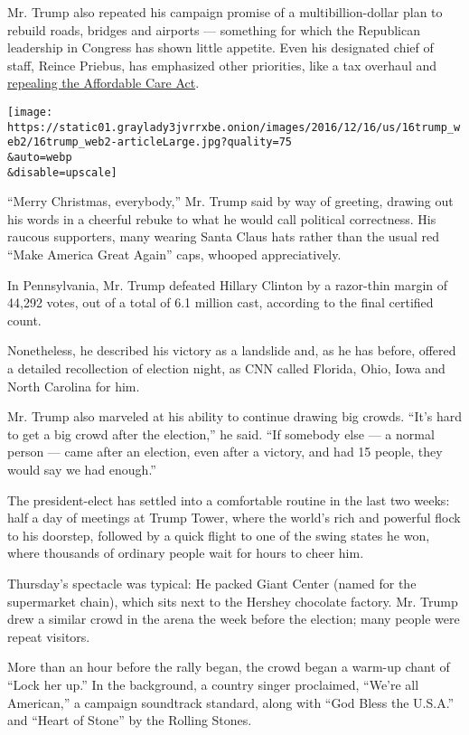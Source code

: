 Mr. Trump also repeated his campaign promise of a multibillion-dollar
plan to rebuild roads, bridges and airports --- something for which the
Republican leadership in Congress has shown little appetite. Even his
designated chief of staff, Reince Priebus, has emphasized other
priorities, like a tax overhaul and
\href{https://www.nytimes3xbfgragh.onion/2016/12/15/us/politics/paul-ryan-affordable-care-act-repeal.html}{repealing
the Affordable Care Act}.

\texttt{[image: https://static01.graylady3jvrrxbe.onion/images/2016/12/16/us/16trump\_web2/16trump\_web2-articleLarge.jpg?quality=75\\\&auto=webp\\\&disable=upscale]}

``Merry Christmas, everybody,'' Mr. Trump said by way of greeting,
drawing out his words in a cheerful rebuke to what he would call
political correctness. His raucous supporters, many wearing Santa Claus
hats rather than the usual red ``Make America Great Again'' caps,
whooped appreciatively.

In Pennsylvania, Mr. Trump defeated Hillary Clinton by a razor-thin
margin of 44,292 votes, out of a total of 6.1 million cast, according to
the final certified count.

Nonetheless, he described his victory as a landslide and, as he has
before, offered a detailed recollection of election night, as CNN called
Florida, Ohio, Iowa and North Carolina for him.

Mr. Trump also marveled at his ability to continue drawing big crowds.
``It's hard to get a big crowd after the election,'' he said. ``If
somebody else --- a normal person --- came after an election, even after
a victory, and had 15 people, they would say we had enough.''

The president-elect has settled into a comfortable routine in the last
two weeks: half a day of meetings at Trump Tower, where the world's rich
and powerful flock to his doorstep, followed by a quick flight to one of
the swing states he won, where thousands of ordinary people wait for
hours to cheer him.

Thursday's spectacle was typical: He packed Giant Center (named for the
supermarket chain), which sits next to the Hershey chocolate factory.
Mr. Trump drew a similar crowd in the arena the week before the
election; many people were repeat visitors.

More than an hour before the rally began, the crowd began a warm-up
chant of ``Lock her up.'' In the background, a country singer
proclaimed, ``We're all American,'' a campaign soundtrack standard,
along with ``God Bless the U.S.A.'' and ``Heart of Stone'' by the
Rolling Stones.


